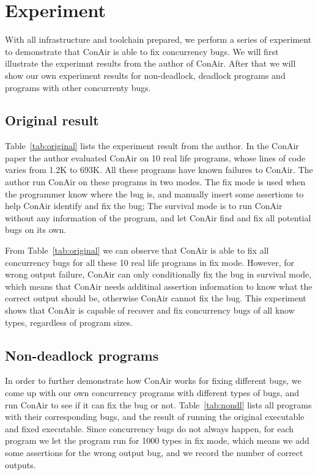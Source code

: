 \section{Experiment}
\label{sec:experiment}
With all infrastructure and toolchain prepared, we perform a series of experiment
to demonstrate that ConAir is able to fix concurrency bugs. We will first
illustrate the experimnt results from the author of ConAir. After that we will
show our own experiment results for non-deadlock, deadlock programs and programs
with other concurrenty bugs.

\subsection{Original result}
Table~\ref{tab:original} lists the experiment result from the author. In the
ConAir paper the author evaluated ConAir on 10 real life programs, whose lines
of code varies from 1.2K to 693K. All these programs have known failures to
ConAir. The author run ConAir on these programs in two modes. The fix mode is
used when the programmer know where the bug is, and manually insert some
assertions to help ConAir identify and fix the bug; The survival mode is to run
ConAir without any information of the program, and let ConAir find and fix all
potential bugs on its own.



From Table~\ref{tab:original} we can observe that ConAir is able to fix all
concurrency bugs for all these 10 real life programs in fix mode. However, for
wrong output failure, ConAir can only conditionally fix the bug in survival
mode, which means that ConAir needs additinal assertion information to know what
the correct output should be, otherwise ConAir cannot fix the bug. This
experiment shows that ConAir is capable of recover and fix concurrency bugs of
all know types, regardless of program sizes.

\subsection{Non-deadlock programs}
In order to further demonstrate how ConAir works for fixing different bugs, we
come up with our own concurrency programs with different types of bugs, and run
ConAir to see if it can fix the bug or not. Table~\ref{tab:nondl} lists all
programs with their corresponding bugs, and the result of running the original
executable and fixed executable. Since concurrency bugs do not always happen,
for each program we let the program run for 1000 types in fix mode, which means
  we add some assertions for the wrong output bug, and we record the number of
  correct outputs.

